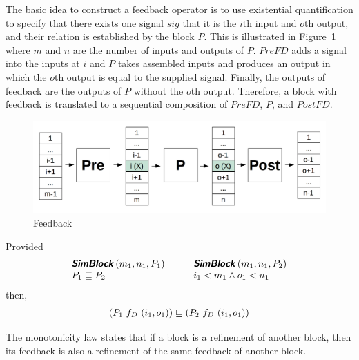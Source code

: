 The basic idea to construct a feedback operator is to use existential quantification to specify that there exists one signal $sig$ that it is the $i$th input and $o$th output, and their relation is established by the block $P$. This is illustrated in Figure~\ref{fig:feedback} where $m$ and $n$ are the number of inputs and outputs of $P$. $PreFD$ adds a signal into the inputs at $i$ and $P$ takes assembled inputs and produces an output in which the $o$th output is equal to the supplied signal. Finally, the outputs of feedback are the outputs of $P$ without the $o$th output. Therefore, a block with feedback is translated to a sequential composition of $PreFD$, $P$, and $PostFD$.

\begin{figure}[htb]
    \begin{center}
        \includegraphics[scale=0.45]{feedback}
    \end{center}
    \caption{Feedback}
    \label{fig:feedback}
\end{figure}

\begin{theorem}[Monotonicity]
    Provided 
    \begin{align*}
        \begin{array}[]{ll}
        \healthy{SimBlock}\left(m_1, n_1, P_1\right) & \qquad \healthy{SimBlock}\left(m_1, n_1, P_2\right) \\
        P_1 \refinedby P_2 & \qquad i_1 < m_1 \land o_1 < n_1 \\
        \end{array}
    \end{align*}
    then,
    \begin{align*} 
       \left(P_1~f_D~(i_1, o_1)\right) \refinedby \left(P_2~f_D~(i_1, o_1)\right)
    \end{align*}
    \label{thm:fd_mono}
\end{theorem}
The monotonicity law states that if a block is a refinement of another block, then its feedback is also a refinement of the same feedback of another block. 

